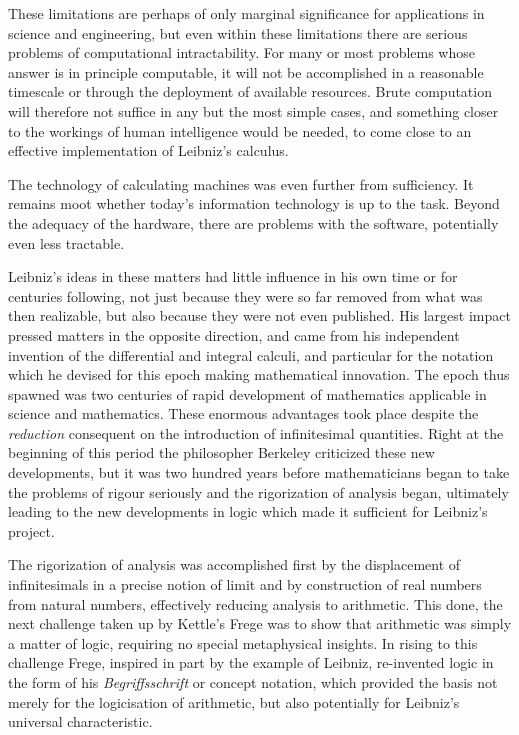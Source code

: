 These limitations are perhaps of only marginal significance for
applications in science and engineering, but even within these
limitations there are serious problems of computational
intractability. 
For many or most problems whose answer is in principle computable, it
will not be accomplished in a reasonable timescale or through the
deployment of available resources. 
Brute computation will therefore not suffice in any but the most
simple cases, and something closer to the workings of human
intelligence would be needed, to come close to an effective
implementation of Leibniz's calculus. 

The technology of calculating machines was even further from sufficiency.
It remains moot whether today's information technology is up to the task.
Beyond the adequacy of the hardware, there are problems with the
software, potentially even less tractable. 

Leibniz's ideas in these matters had little influence in his own time
or for centuries following, not just because they were so far removed
from what was then realizable, but also because they were not even
published. 
His largest impact pressed matters in the opposite direction, and came
from his independent invention of the differential and integral
calculi, and particular for the notation which he devised for this
epoch making mathematical innovation. 
The epoch thus spawned was two centuries of rapid development of
mathematics applicable in science and mathematics. 
These enormous advantages took place despite the \emph{reduction}
consequent on the introduction of infinitesimal quantities. 
Right at the beginning of this period the philosopher Berkeley
criticized these new developments, but it was two hundred years before
mathematicians began to take the problems of rigour seriously and the
rigorization of analysis began, ultimately leading to the new
developments in logic which made it sufficient for Leibniz's project. 

The rigorization of analysis was accomplished first by the
displacement of infinitesimals in a precise notion of limit and by
construction of real numbers from natural numbers, effectively
reducing analysis to arithmetic. 
This done, the next challenge taken up by Kettle's Frege was to show
that arithmetic was simply a matter of logic, requiring no special
metaphysical insights. 
In rising to this challenge Frege, inspired in part by the example of
Leibniz, re-invented logic in the form of his \emph{Begriffsschrift}
or concept notation, which provided the basis not merely for the
logicisation of arithmetic, but also potentially for Leibniz's
universal characteristic. 


